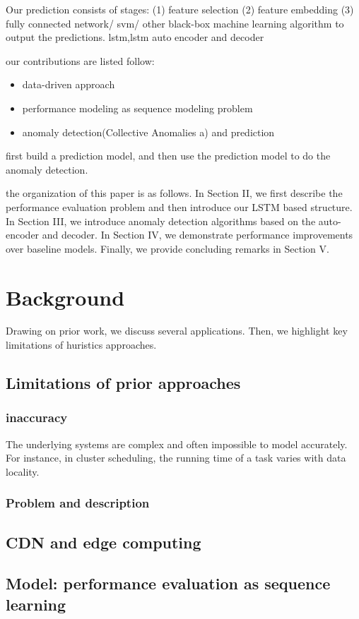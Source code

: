 \documentclass[review]{elsarticle}
\begin{document}
Our prediction consists of stages: (1) feature selection (2) feature embedding (3) fully connected network/ svm/ other black-box machine learning algorithm to output the predictions. 
lstm,lstm auto encoder and decoder

our contributions are listed follow:
\begin{itemize}
  \item data-driven approach
  \item performance modeling as sequence modeling problem
  \item anomaly detection(Collective Anomalies a) and prediction
\end{itemize}

first build a prediction model, and then use the prediction model to do the anomaly detection.

the organization of this paper is as follows. In Section II, we 
first  describe  the performance evaluation problem
and  then  introduce  our  LSTM  based  structure.  In  Section
III, we introduce anomaly detection algorithms based on the
auto-encoder and decoder. In  Section  IV,  we  demonstrate
performance  improvements  over baseline models. 
Finally, we provide concluding remarks in Section V.
\section{Background}
Drawing on prior work, we discuss several applications. Then, we highlight key limitations of huristics approaches.
\subsection{Limitations of prior approaches}
\subsubsection{inaccuracy}
  The underlying systems are complex and often impossible to model accurately. For instance, in cluster scheduling, the running time of a task varies with data locality.
\subsubsection{Problem and description}
\subsection{CDN and edge computing}
\subsection{Model: performance evaluation as sequence learning}
\cite{Langkvist2014AModeling}
\end{document}
